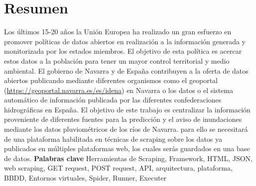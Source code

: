 \chapter*{Resumen}
Los últimos 15-20 años la Unión Europea ha realizado un gran esfuerzo en promover políticas de datos abiertos en realización a la información generada y monitorizada por los estados miembros. El objetivo de esta política es acercar estos datos a la población para tener un mayor control territorial y medio ambiental. El gobierno de Navarra y de España contribuyen a la oferta de datos abiertos publicando mediante diferentes organismos como el geoportal (\url{https://geoportal.navarra.es/es/idena}) en Navarra o los datos o el sistema automático de información publicada por las diferentes confederaciones hidrográficas en España.\newline
\newline
El objetivo de este trabajo es centralizar la información proveniente de diferentes fuentes para la predicción y el aviso de inundaciones mediante los datos pluviométricos de los ríos de Navarra. para ello se necesitará de una plataforma habilitada en técnicas de scraping sobre los datos ya publicados en múltiples plataformas web, los cuales serás guardados en una base de datos.
\newline
\newline
\newline
\newline
\textbf{{\LARGE Palabras clave}}
\newline
\newline
Herramientas de Scraping, Framework, HTML, JSON, web scraping, GET request, POST request, API, arquitectura, plataforma, BBDD, Entornos virtuales, Spider, Runner, Executer